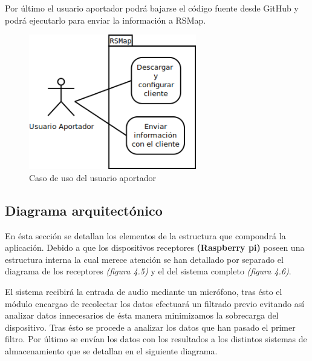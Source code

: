 Por último el usuario aportador podrá bajarse el código fuente desde GitHub y podrá ejecutarlo para enviar la información a RSMap.

\begin{figure}[!ht]
  \begin{center}
  \includegraphics[width=0.65\textwidth]{../images/diag_plan/cu_usuario_aportador.png}
  \caption{Caso de uso del usuario aportador}
  \label{fig:cu_uaportador}
  \end{center}
\end{figure}

\newpage
\subsection{Diagrama arquitectónico}

En ésta sección se detallan los elementos de la estructura que compondrá la aplicación. Debido a que los dispositivos receptores \textbf{(Raspberry pi)} poseen una estructura interna la cual merece atención se han detallado por separado el diagrama de los receptores \textit{(figura 4.5)} y el del sistema completo \textit{(figura 4.6)}.

\bigskip

El sistema recibirá la entrada de audio mediante un micrófono, tras ésto el módulo encargao de recolectar los datos efectuará un filtrado previo evitando así analizar datos innecesarios de ésta manera minimizamos la sobrecarga del dispositivo. Tras ésto se procede a analizar los datos que han pasado el primer filtro. Por último se envían los datos con los resultados a los distintos sistemas de almacenamiento que se detallan en el siguiente diagrama.

\bigskip

